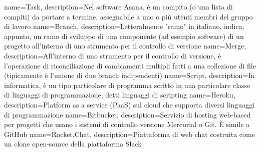  {
	name=Task,
	description={Nel software Asana, è un compito (o una lista di compiti) da portare a termine,
	assegnabile a uno o più utenti membri del gruppo di lavoro}
}
 {
	name=Branch,
	description={Letteralmente "ramo" in italiano, indica, appunto, un ramo di sviluppo di una
	componente (ad esempio software) di un progetto all'interno di uno strumento per il controllo
	di versione}
}
 {
	name=Merge,
	description={All'interno di uno strumento per il controllo di versione, è l'operazione di
	riconciliazione di cambiamenti multipli fatti a una collezione di file (tipicamente è
	l'unione di due branch indipendenti)}
}
 {
	name=Script,
	description={In informatica, è un tipo particolare di programma scritto in una particolare
	classe di linguaggi di programmazione, detti linguaggi di scripting}
}
 {
	name=Heroku,
	description={Platform as a service (PaaS) sul cloud che supporta diversi linguaggi di
	programmazione}
}
 {
	name=Bitbucket,
	description={Servizio di hosting web-based per progetti che usano i sistemi di controllo
	versione Mercurial o Git. È simile a GitHub}
}
 {
	name=Rocket.Chat,
	description={Piattaforma di web chat costruita come un clone open-source della piattaforma
	Slack}
}